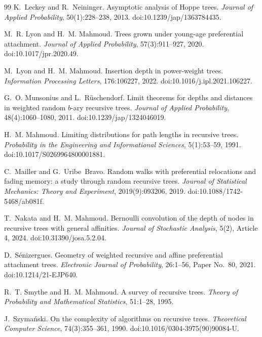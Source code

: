\documentclass[11pt,a4paper]{article}
\newcommand{\1}{\mathbf{1}}
\begin{document}
\begin{thebibliography}{99}
K.~Leckey and R.~Neininger.
\newblock Asymptotic analysis of Hoppe trees.
\newblock \emph{Journal of Applied Probability}, 50(1):228--238, 2013.
\newblock doi:10.1239/jap/1363784435.

M.~R. Lyon and H.~M. Mahmoud.
\newblock Trees grown under young-age preferential attachment.
\newblock \emph{Journal of Applied Probability}, 57(3):911--927, 2020.
\newblock doi:10.1017/jpr.2020.49.

M.~Lyon and H.~M. Mahmoud.
\newblock Insertion depth in power-weight trees.
\newblock \emph{Information Processing Letters}, 176:106227, 2022.
\newblock doi:10.1016/j.ipl.2021.106227.

G.~O. Munsonius and L.~R\"uschendorf.
\newblock Limit theorems for depths and distances in weighted random $b$-ary recursive trees.
\newblock \emph{Journal of Applied Probability}, 48(4):1060--1080, 2011.
\newblock doi:10.1239/jap/1324046019.

H.~M. Mahmoud.
\newblock Limiting distributions for path lengths in recursive trees.
\newblock \emph{Probability in the Engineering and Informational Sciences},
5(1):53--59, 1991.
\newblock doi:10.1017/S0269964800001881.

C.~Mailler and G.~Uribe~Bravo.
\newblock Random walks with preferential relocations and fading memory:
a study through random recursive trees.
\newblock \emph{Journal of Statistical Mechanics: Theory and Experiment},
2019(9):093206, 2019.
\newblock doi:10.1088/1742-5468/ab081f.

T.~Nakata and H.~M. Mahmoud.
\newblock Bernoulli convolution of the depth of nodes in recursive trees with general affinities.
\newblock \emph{Journal of Stochastic Analysis}, 5(2), Article 4, 2024.
\newblock doi:10.31390/josa.5.2.04.

D.~S\'enizergues.
\newblock Geometry of weighted recursive and affine preferential attachment
trees.
\newblock \emph{Electronic Journal of Probability}, 26:1--56, Paper No.~80,
2021.
\newblock doi:10.1214/21-EJP640.

R.~T. Smythe and H.~M. Mahmoud.
\newblock A survey of recursive trees.
\newblock \emph{Theory of Probability and Mathematical Statistics}, 51:1--28,
1995.

J.~Szyma\'nski.
\newblock On the complexity of algorithms on recursive trees.
\newblock \emph{Theoretical Computer Science}, 74(3):355--361, 1990.
\newblock doi:10.1016/0304-3975(90)90084-U.

\end{thebibliography}
\end{document}
